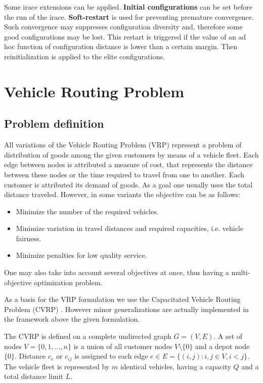 \documentclass[12pt,a4paper,oneside]{book}
\begin{document}
Some irace extensions can be applied. \textbf{Initial configurations} can be set before the run of the irace. \textbf{Soft-restart} is used for preventing premature convergence. Such convergence may suppresses configuration diversity and, therefore some good configurations may be lost. This restart is triggered if the value of an ad hoc function of configuration distance is lower than a certain margin. Then reinitialization is applied to the elite configurations.


\chapter{Vehicle Routing Problem}


\section{Problem definition}

All variations of the Vehicle Routing Problem (VRP) represent a problem of distribution of goods among the given customers by means of a vehicle fleet. Each edge between nodes is attributed a measure of cost, that represents the distance between these nodes or the time required to travel from one to another. Each customer is attributed its demand of goods. As a goal one usually uses the total distance traveled. However, in some variants the objective can be as follows:

\begin{itemize}
\item Minimize the number of the required vehicles.
\item Minimize variation in travel distances and required capacities, i.e. vehicle fairness.
\item Minimize penalties for low quality service.
\end{itemize}

One may also take into account several objectives at once, thus having a multi-objective optimization problem.

As a basis for the VRP formulation we use the Capacitated Vehicle Routing Problem (CVRP) \cite{CORDEAU2007367}. However minor generalizations are actually implemented in the framework above the given formulation. \par

The CVRP is defined on a complete undirected graph $G=(V,E)$. A set of nodes $V=\{0,1,...,n\}$ is a union of all customer nodes $V\setminus\{0\}$ and a depot node $\{0\}$. Distance $c_e$ or $c_{ij}$ is assigned to each edge $e \in E = \{(i,j): i,j \in V, i<j\}$. The vehicle fleet is represented by $m$ identical vehicles, having a capacity $Q$ and a total distance limit $L$.
\end{document}
